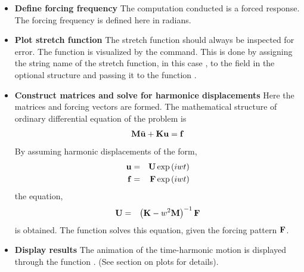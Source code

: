 \begin{itemize}

  \item{\textbf{Define forcing frequency}}
  The computation conducted is a forced response. The 
  forcing frequency  is defined here in radians.

  \item{\textbf{Plot stretch function}}
  The stretch function should always be inspected for error.
  The function is visualized by the  command.
  This is done by assigning the string name of the stretch function, 
  in this case , to the field 
  in the optional structure  and passing it to the 
  function . 

  \item{\textbf{Construct matrices and solve for harmonice displacements}}
  Here the matrices and forcing vectors are formed. The mathematical 
  structure of ordinary differential equation of the problem is
  \begin{eqnarray}
     \mathbf{M}\ddot{\mathbf{u}} + \mathbf{K}\mathbf{u} = \mathbf{f} \nonumber
  \end{eqnarray} 
  By assuming harmonic displacements of the form,
  \begin{eqnarray}
     \mathbf{u} &=& \mathbf{U} \exp\left(iwt\right) \nonumber \\
     \mathbf{f} &=& \mathbf{F} \exp\left(iwt\right) \nonumber
  \end{eqnarray}
  the equation,
  \begin{eqnarray}
    \mathbf{U} &=& \left(\mathbf{K}-w^2\mathbf{M}\right)^{-1}\mathbf{F} \nonumber
  \end{eqnarray}
  is obtained. 
  The function  solves this equation, given
  the forcing pattern $\mathbf{F}$.

  \item{\textbf{Display results}}
  The animation of the time-harmonic motion is displayed through
  the function . (See section on plots for details).

\end{itemize}

